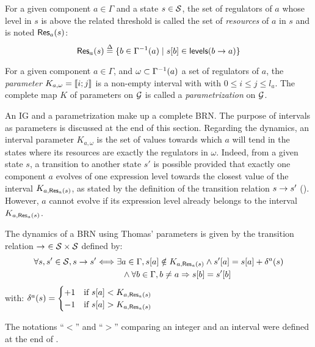 \begin{definition}\label{def:resources}
For a given component $a \in \Gamma$ and a state $s \in \mathcal{S}$,
the set of regulators of $a$ whose level in $s$ is above the related threshold %
is called the set of \emph{resources} of $a$ in $s$ and is noted $\mathsf{Res}_{a}(s)$:
$$\mathsf{Res}_{a}(s) \stackrel{\Delta}= \{ b \in \Gamma^{-1}(a) \mid {s[b]} \in \mathsf{levels}(b\rightarrow a) \}$$
\end{definition}

\begin{definition}\label{def:param}
For a given component $a \in \Gamma$, and $\omega \subset \Gamma^{-1}(a)$ a set of regulators of $a$,
the \emph{parameter} $K_{a,\omega} = \llbracket i ; j \rrbracket$ is a non-empty interval with with $0 \leq i \leq j \leq l_a$.
The complete map $K$ of parameters on $\mathcal{G}$ is called a \emph{parametrization} on $\mathcal{G}$.
\end{definition}

An IG and a parametrization make up a complete BRN.
The purpose of intervals as parameters is discussed at the end of this section.
Regarding the dynamics, an interval parameter $K_{a,\omega}$ is the set of values towards which $a$ will tend
in the states where its resources are exactly the regulators in $\omega$.
Indeed, from a given state $s$, a transition to another state $s'$ is possible provided that
exactly one component $a$ evolves of one expression level towards the closest value of the interval $K_{a,\mathsf{Res}_{a}(s)}$,
as stated by the definition of the transition relation $s \rightarrow s'$ ().
However, $a$ cannot evolve if its expression level already belongs to the interval $K_{a,\mathsf{Res}_{a}(s)}$.

\begin{definition}\label{def:dynamics}
The dynamics of a BRN using Thomas' parameters is given by the transition relation $\rightarrow\ \in \mathcal{S} \times \mathcal{S}$ defined by:
\begin{align*}
  \forall s, s' \in \mathcal{S}, s \rightarrow s' &\Longleftrightarrow \exists a \in \Gamma,
  {s[a]} \notin K_{a, \mathsf{Res}_{a}(s)} \wedge {s'[a]} = {s[a]} + \delta^a(s) \\
    & \qquad\quad \wedge \forall b \in \Gamma, b \neq a \Rightarrow {s[b]} = {s'[b]}
\end{align*}
with: $\delta^a(s) = 
  \begin{cases}
    +1 & \text{if } {s[a]} < K_{a, \mathsf{Res}_{a}(s)} \\
    -1 & \text{if } {s[a]} > K_{a, \mathsf{Res}_{a}(s)} \\
  \end{cases}$
\end{definition}
The notations “$<$” and “$>$” comparing an integer and an interval were defined at the end of .



